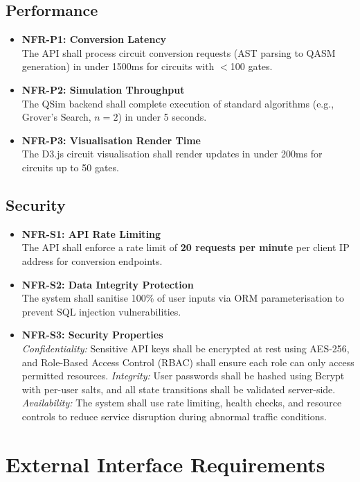 \subsection{Performance}
\begin{itemize}
    \item \textbf{NFR-P1: Conversion Latency} \\
    The API shall process circuit conversion requests (AST parsing to QASM generation) in under 1500ms for circuits with $<$100 gates.
    \item \textbf{NFR-P2: Simulation Throughput} \\
    The QSim backend shall complete execution of standard algorithms (e.g., Grover's Search, $n=2$) in under 5 seconds.
    \item \textbf{NFR-P3: Visualisation Render Time} \\
    The D3.js circuit visualisation shall render updates in under 200ms for circuits up to 50 gates.
\end{itemize}

\subsection{Security}
\begin{itemize}
    \item \textbf{NFR-S1: API Rate Limiting} \\
    The API shall enforce a rate limit of \textbf{20 requests per minute} per client IP address for conversion endpoints.
    \item \textbf{NFR-S2: Data Integrity Protection} \\
    The system shall sanitise 100\% of user inputs via ORM parameterisation to prevent SQL injection vulnerabilities.
    \item \textbf{NFR-S3: Security Properties} \\
    \textit{Confidentiality:} Sensitive API keys shall be encrypted at rest using AES-256, and Role-Based Access Control (RBAC) shall ensure each role can only access permitted resources. \textit{Integrity:} User passwords shall be hashed using Bcrypt with per-user salts, and all state transitions shall be validated server-side. \textit{Availability:} The system shall use rate limiting, health checks, and resource controls to reduce service disruption during abnormal traffic conditions.
\end{itemize}

\clearpage
\section{External Interface Requirements}

